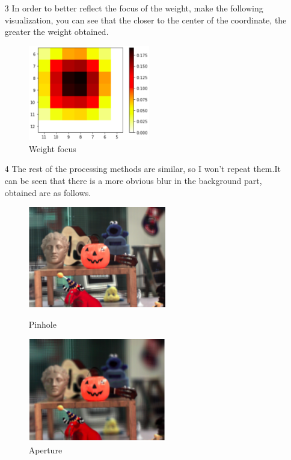 \documentclass[letterpaper,12pt]{article}
\begin{document}
\begin{itemize}
	\item[3]
	In order to better reflect the focus of the weight, make the following visualization, you can see that the closer to the center of the coordinate, the greater the weight obtained.
	\begin{figure}[h]
	\centering 
	\includegraphics[width=0.5\textwidth]{Image/heat.png}
	\caption{Weight focus}
	\end{figure}
	\newpage
	\item[4]The rest of the processing methods are similar, so I won’t repeat them.It can be seen that there is a more obvious blur in the background part, obtained are as follows.
	\begin{figure}[htbp]
		\centering
		\begin{minipage}[t]{0.48\textwidth}
			\centering
			\includegraphics[width=6cm]{Image/size0.png}
			\caption{Pinhole}
		\end{minipage}
		\begin{minipage}[t]{0.48\textwidth}
			\centering
			\includegraphics[width=6cm]{Image/size2.png}
			\caption{Aperture}
		\end{minipage}
	\end{figure}

\end{itemize}
\end{document}
